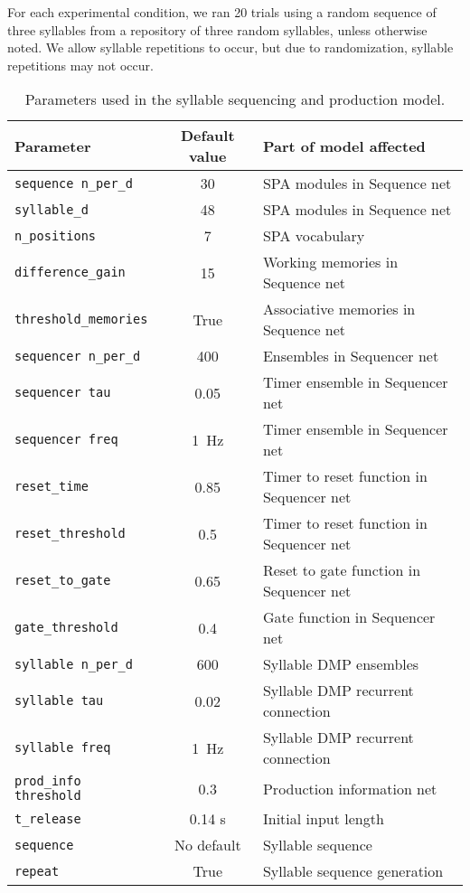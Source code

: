 For each experimental condition,
we ran 20 trials using
a random sequence of three syllables
from a repository of three random syllables,
unless otherwise noted.
We allow syllable repetitions to occur,
but due to randomization,
syllable repetitions may not occur.

\begin{table}[ht!]
  \begin{footnotesize}
    \begin{center}
      \begin{tabular}{lcl}
        \toprule
        Parameter & Default value & Part of model affected \\
        \midrule
        \texttt{sequence n\_per\_d} & 30 & SPA modules in Sequence net \\
        \texttt{syllable\_d} & 48 & SPA modules in Sequence net \\
        \texttt{n\_positions} & 7 & SPA vocabulary \\
        \texttt{difference\_gain} & 15 & Working memories in Sequence net \\
        \texttt{threshold\_memories} & True
          & Associative memories in Sequence net \\
        \texttt{sequencer n\_per\_d} & 400 & Ensembles in Sequencer net \\
        \texttt{sequencer tau} & 0.05 & Timer ensemble in Sequencer net \\
        \texttt{sequencer freq} & 1~Hz & Timer ensemble in Sequencer net \\
        \texttt{reset\_time} & 0.85
          & Timer to reset function in Sequencer net \\
        \texttt{reset\_threshold} & 0.5
          & Timer to reset function in Sequencer net \\
        \texttt{reset\_to\_gate} & 0.65
          & Reset to gate function in Sequencer net \\
        \texttt{gate\_threshold} & 0.4 & Gate function in Sequencer net \\
        \texttt{syllable n\_per\_d} & 600 & Syllable DMP ensembles \\
        \texttt{syllable tau} & 0.02 & Syllable DMP recurrent connection \\
        \texttt{syllable freq} & 1~Hz & Syllable DMP recurrent connection \\
        \texttt{prod\_info threshold} & 0.3 & Production information net \\
        \texttt{t\_release} & 0.14 s & Initial input length \\
        \texttt{sequence} & No default & Syllable sequence \\
        \texttt{repeat} & True & Syllable sequence generation \\
        \bottomrule
      \end{tabular}
    \end{center}
  \end{footnotesize}
  \caption{Parameters used in the syllable sequencing and production model.}
\label{tab:prod}
\end{table}

